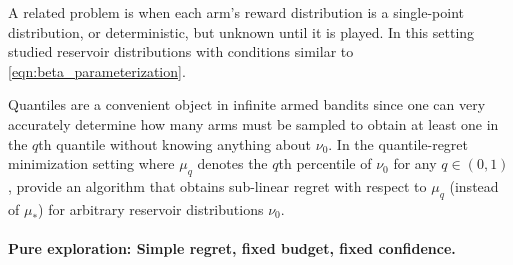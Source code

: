 A related problem is when each arm's reward distribution is a single-point distribution, or deterministic, but unknown until it is played.
In this setting \cite{david2014infinitely,david2015refined} studied reservoir distributions with conditions similar to \eqref{eqn:beta_parameterization}.

Quantiles are a convenient object in infinite armed bandits since one can very accurately determine how many arms must be sampled to obtain at least one in the $q$th quantile without knowing anything about $\nu_0$. 
In the quantile-regret minimization setting where $\mu_q$ denotes the $q$th percentile of $\nu_0$ for any $q \in (0,1)$, \cite{chaudhuriquantile} provide an algorithm that obtains sub-linear regret with respect to $\mu_q$ (instead of $\mu_*$) for arbitrary reservoir distributions $\nu_0$.

\paragraph{Pure exploration: Simple regret, fixed budget, fixed confidence.}


